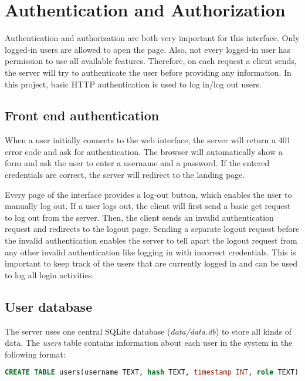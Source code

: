 \chapter{Authentication and Authorization}
\label{ch:authentication_and_authorization}
Authentication and authorization are both very important for this interface. Only logged-in users are allowed to open the page. Also, not every logged-in user has permission to use all available features. Therefore, on each request a client sends, the server will try to authenticate the user before providing any information. In this project, basic HTTP authentication is used to log in/log out users.\\

\section{Front end authentication}
\label{sec:front_end_authentication}
When a user initially connects to the web interface, the server will return a 401 error code and ask for authentication. The browser will automatically show a form and ask the user to enter a username and a password. If the entered credentials are correct, the server will redirect to the landing page.

Every page of the interface provides a log-out button, which enables the user to manually log out. 
If a user logs out, the client will first send a basic get request to log out from the server. Then, the client sends an invalid authentication request and redirects to the logout page.
Sending a separate logout request before the invalid authentication enables the server to tell apart the logout request from any other invalid authentication like logging in with incorrect credentials. This is important to keep track of the users that are currently logged in and can be used to log all login activities.


\section{User database}
\label{sec:user_database}
The server uses one central SQLite database (\textit{data/data.db}) to store all kinds of data. The \textit{users} table contains information about each user in the system in the following format:

\begin{lstlisting}[label = lst:users, language = SQL, numbers = none]
 CREATE TABLE users(username TEXT, hash TEXT, timestamp INT, role TEXT);
\end{lstlisting}

